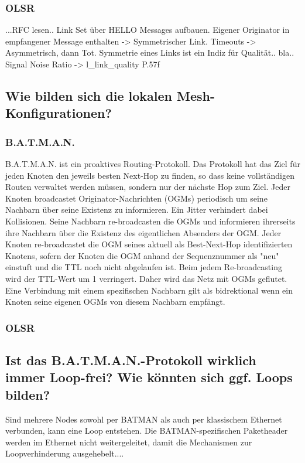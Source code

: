 \documentclass[a4paper,10pt]{article}
\begin{document}

\subsubsection*{OLSR}

...RFC lesen..
Link Set über HELLO Messages aufbauen. Eigener Originator in empfangener Message enthalten -> Symmetrischer Link. Timeouts -> Asymmetrisch, dann Tot.
Symmetrie eines Links ist ein Indiz für Qualität.. bla..
Signal Noise Ratio -> l\_link\_quality P.57f

\subsection{Wie bilden sich die lokalen Mesh-Konfigurationen?}


\subsubsection*{B.A.T.M.A.N.}

B.A.T.M.A.N. ist ein proaktives Routing-Protokoll.
Das Protokoll hat das Ziel für jeden Knoten den jeweils besten Next-Hop zu finden, so dass keine vollständigen Routen verwaltet werden müssen, sondern nur der nächste Hop zum Ziel.
Jeder Knoten broadcastet Originator-Nachrichten (OGMs) periodisch um seine Nachbarn über seine Existenz zu informieren.
Ein Jitter verhindert dabei Kollisionen.
Seine Nachbarn re-broadcasten die OGMs und informieren ihrerseits ihre Nachbarn über die Existenz des eigentlichen Absenders der OGM.
Jeder Knoten re-broadcastet die OGM seines aktuell als Best-Next-Hop identifizierten Knotens, sofern der Knoten die OGM anhand der Sequenznummer als "neu" einstuft und die TTL noch nicht abgelaufen ist.
Beim jedem Re-broadcasting wird der TTL-Wert um 1 verringert.
Daher wird das Netz mit OGMs geflutet.
Eine Verbindung mit einem spezifischen Nachbarn gilt als bidrektional wenn ein Knoten seine eigenen OGMs von diesem Nachbarn empfängt.


\subsubsection*{OLSR}

\subsection{Ist das B.A.T.M.A.N.-Protokoll wirklich immer Loop-frei? Wie könnten sich ggf. Loops bilden?}
Sind mehrere Nodes sowohl per BATMAN als auch per klassischem Ethernet verbunden, kann eine Loop entstehen. Die BATMAN-spezifischen Paketheader werden im Ethernet nicht weitergeleitet, damit die Mechanismen zur Loopverhinderung ausgehebelt....
\end{document}
